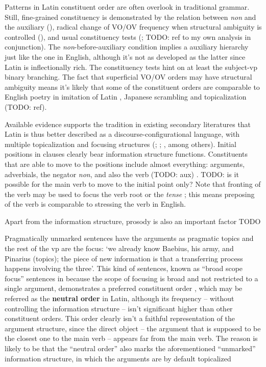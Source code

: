 \documentclass[a4paper, oneside, 12pt]{report}
\newcommand*{\citesec}[1]{\S~{#1}}
\newcommand*{\citepage}[1]{p.~{#1}}
\newcommand*{\concept}[1]{\textbf{#1}}
\newcommand{\form}[1]{\emph{#1}}
\newcommand{\translate}[1]{`#1'}
\begin{document}
Patterns in Latin constituent order are often overlook in traditional grammar.
Still, fine-grained constituency is demonstrated by 
the relation between \form{non} and the auxiliary 
(),
radical change of VO/OV frequency when structural ambiguity is controlled
(),
and usual constituency tests 
(\citealt[\citesec{1.6}]{danckaert2017development}; TODO: ref to my own analysis in conjunction).
The \form{non}-before-auxiliary condition implies 
a auxiliary hierarchy just like the one in English, 
although it's not as developed as the latter 
since Latin is inflectionally rich.
The constituency tests hint on 
at least the subject-\acs{vp} binary branching.
The fact that superficial VO/OV orders may have structural ambiguity 
means it's likely that some of the constituent orders 
are comparable to
English poetry in imitation of Latin \citep[\citesec{600}]{allen1903allen},
Japanese scrambling and topicalization (TODO: ref).

Available evidence supports the tradition in existing secondary literatures that
Latin is thus better described as a discourse-configurational language,
with multiple topicalization and focusing structures
(\citealt[\citepage{189}]{oniga2014latin}; 
\citealt[\citepage{77}]{danckaert2017development}; 
\citealt{devine2006latin}, among others).
Initial positions in clauses clearly bear information structure functions. 
Constituents that are able to move to the positions 
include almost everything: 
arguments, adverbials, the negator \form{non}, 
and also the verb (TODO: aux) 
\citep[\citesec{598}]{allen1903allen}. 
TODO: is it possible for the main verb to move to the initial point only?
Note that fronting of the verb may be used 
to focus the verb root or the \emph{tense}
\citep[\citepage{397}]{allen1903allen};
this means preposing of the verb is comparable to 
stressing the verb in English.

Apart from the information structure, 
prosody is also an important factor TODO

Pragmatically unmarked sentences have the arguments as pragmatic topics 
and the rest of the \acs{vp} are the focus:
\translate{we already know Baebius, his army, and Pinarius (topics);
the piece of new information is that 
a transferring process happens involving the three}.
This kind of sentences, known as ``broad scope focus'' sentences 
in \citet[\citepage{15}]{devine2006latin}
because the scope of focusing is broad
and not restricted to a single argument,
demonstrates a preferred constituent order 
\citep[\citepage{79}]{devine2006latin},
which may be referred as the \concept{neutral order} in Latin,
although its frequency -- without controlling the information structure -- 
isn't significant higher than other constituent orders.
This order clearly isn't a faithful representation 
of the argument structure, 
since the direct object -- the argument that is supposed to be the closest one to the main verb -- 
appears far from the main verb. 
The reason is likely to be that the ``neutral order'' also marks 
the aforementioned ``unmarked'' information structure, 
in which the arguments are by default topicalized 
\end{document}
